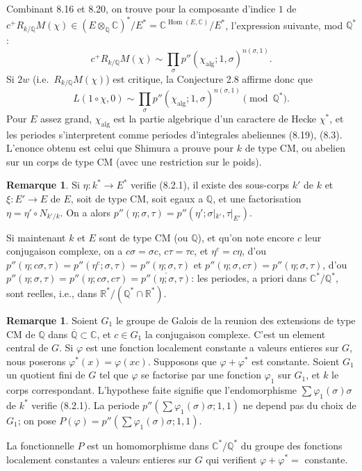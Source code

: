 \documentclass[12pt,a4paper]{article}
\theoremstyle{plain}
\theoremstyle{definition}
\newtheorem{remark}[definition]{Remarque}
\theoremstyle{remark}
\DeclareMathOperator{\Hom}{Hom}
\newcommand{\Q}{\mathbb{Q}}
\newcommand{\R}{\mathbb{R}}
\newcommand{\C}{\mathbb{C}}
\begin{document}
Combinant 8.16 et 8.20, on trouve pour la composante d'indice $1$ de
$c^+ R_{k/\Q} M(\chi) \in (E \otimes_\Q \C)^*/E^* = \C^{\Hom(E,\C)}/E^*$, l'expression suivante,
mod $\Q^*$:
\[
c^+ R_{k/\Q} M(\chi) \sim \prod_\sigma p''(\chi_{\text{alg}}; 1, \sigma)^{n(\sigma,1)}.
\]
Si $2w$ (i.e.~$R_{k/\Q} M(\chi)$) est critique, la Conjecture 2.8 affirme donc que
\[
L(1 \circ \chi, 0) \sim \prod_\sigma p''(\chi_{\text{alg}}; 1, \sigma)^{n(\sigma,1)} \pmod{\Q^*}.
\]
Pour $E$ assez grand, $\chi_{\text{alg}}$ est la partie algebrique d'un caractere de Hecke $\chi^*$,
et les periodes s'interpretent comme periodes d'integrales abeliennes (8.19), (8.3).
L'enonce obtenu est celui que Shimura a prouve pour $k$ de type CM, ou abelien sur
un corps de type CM (avec une restriction sur le poids).

\begin{remark}
Si $\eta: k^* \to E^*$ verifie (8.2.1), il existe des sous-corps $k'$ de $k$ et
$\xi: E' \to E$ de $E$, soit de type CM, soit egaux a $\Q$, et une factorisation
$\eta = \eta' \circ N_{k'/k}$. On a alors $p''(\eta; \sigma, \tau) = p''(\eta'; \sigma|_{k'}, \tau|_{E'})$.

Si maintenant $k$ et $E$ sont de type CM (ou $\Q$), et qu'on note encore $c$ leur
conjugaison complexe, on a $c\sigma = \sigma c$, $c\tau = \tau c$, et $\eta^c = c\eta$, d'ou
$p''(\eta; c\sigma, \tau) = p''(\eta^c; \sigma, \tau) = p''(\eta; \sigma, \tau)$ et $p''(\eta; \sigma, c\tau) =
p''(\eta; \sigma, \tau)$, d'ou $p''(\eta; \sigma, \tau) = p''(\eta; c\sigma, c\tau) =
\overline{p''(\eta; \sigma, \tau)}$: les periodes, a priori dans $\C^*/\Q^*$, sont reelles, i.e.,
dans $\R^*/(\Q^* \cap \R^*)$.
\end{remark}

\begin{remark}
Soient $G_1$ le groupe de Galois de la reunion des extensions de type CM de $\Q$
dans $\overline{\Q} \subset \C$, et $c \in G_1$ la conjugaison complexe. C'est un element central
de $G$. Si $\varphi$ est une fonction localement constante a valeurs entieres sur $G$, nous
poserons $\varphi^*(x) = \varphi(xc)$. Supposons que $\varphi + \varphi^*$ est constante. Soient $G_1$ un
quotient fini de $G$ tel que $\varphi$ se factorise par une fonction $\varphi_1$ sur $G_1$, et $k$ le corps
correspondant. L'hypothese faite signifie que l'endomorphisme $\sum \varphi_1(\sigma) \sigma$
de $k^*$ verifie (8.2.1). La periode $p''(\sum \varphi_1(\sigma) \sigma; 1, 1)$ ne depend pas du choix
de $G_1$; on pose $P(\varphi) = p''(\sum \varphi_1(\sigma) \sigma; 1, 1)$.

La fonctionnelle $P$ est un homomorphisme dans $\C^*/\Q^*$ du groupe des
fonctions localement constantes a valeurs entieres sur $G$ qui verifient
$\varphi + \varphi^* =$ constante.
\end{remark}
\end{document}
